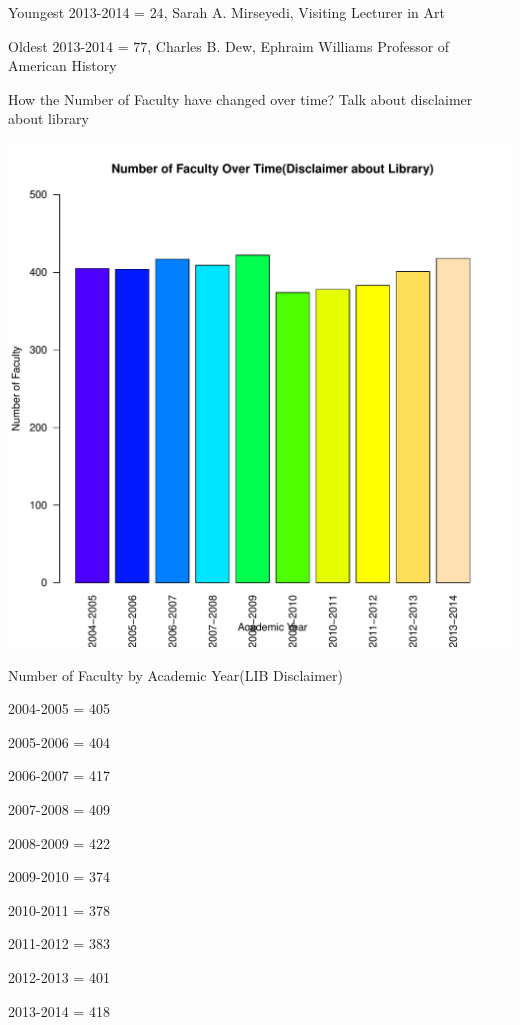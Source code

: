 \documentclass[12pt,a4paper]{article}\usepackage[]{graphicx}\usepackage[]{color}
\makeatletter
\def\maxwidth{ %
  \ifdim\Gin@nat@width>\linewidth
    \linewidth
  \else
    \Gin@nat@width
  \fi
}
\newenvironment{knitrout}{}{} %
\theoremstyle{definition}
\makeatother
\begin{document}
\bigskip
Youngest 2013-2014 = \(24\), Sarah A. Mirseyedi, Visiting Lecturer in Art

\bigskip
Oldest 2013-2014 = \(77\), Charles B. Dew, Ephraim Williams Professor of American History

\bigskip
How the Number of Faculty have changed over time? Talk about disclaimer about library



\begin{knitrout}
\color{fgcolor}
\includegraphics[width=\maxwidth]{figure/unnamed-chunk-8-1} 

\end{knitrout}

\begin{center}
Number of Faculty by Academic Year(LIB Disclaimer)

2004-2005 = 405

2005-2006 = 404

2006-2007 = 417

2007-2008 = 409

2008-2009 = 422

2009-2010 = 374

2010-2011 = 378

2011-2012 = 383

2012-2013 = 401

2013-2014 = 418
\end{center}
\end{document}
